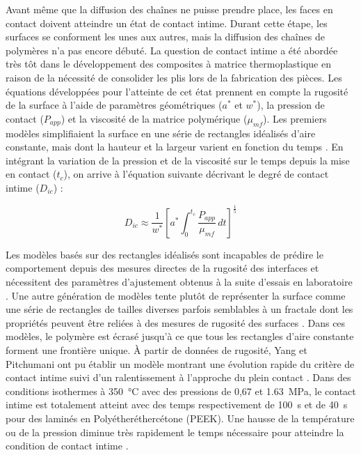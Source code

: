 Avant même que la diffusion des chaînes ne puisse prendre place, les faces en contact doivent atteindre un état de contact intime. 
Durant cette étape, les surfaces se conforment les unes aux autres, mais la diffusion des chaînes de polymères n'a pas encore débuté. 
La question de contact intime a été abordée très tôt dans le développement des composites à matrice thermoplastique en raison de la nécessité de consolider les plis lors de la fabrication des pièces. 
Les équations développées pour l'atteinte de cet état prennent en compte la rugosité de la surface à l'aide de paramètres géométriques ($a^*$ et $w^*$), la pression de contact ($P_{app}$) et la viscosité de la matrice polymérique ($\mu _{mf}$). 
Les premiers modèles simplifiaient la surface en une série de rectangles idéalisés d'aire constante, mais dont la hauteur et la largeur varient en fonction du temps \cite{Lee1987}. 
En intégrant la variation de la pression et de la viscosité sur le temps depuis la mise en contact ($t_c$), on arrive à l'équation suivante décrivant le degré de contact intime ($D_{ic}$) \cite{Mantell1992a} : 

\begin{equation}
D_{ic} \approx \frac{1}{w^*} \left[ a^* \int_{0}^{t_c} \frac{P_{app}}{\mu _{mf}} \, dt \right]^{\frac{1}{5}}
\label{eq:contact_intime}
\end{equation}

Les modèles basés sur des rectangles idéalisés sont incapables de prédire le comportement depuis des mesures directes de la rugosité des interfaces et nécessitent des paramètres d'ajustement obtenus à la suite d'essais en laboratoire \cite{Yang2001}. 
Une autre génération de modèles tente plutôt de représenter la surface comme une série de rectangles de tailles diverses parfois semblables à un fractale dont les propriétés peuvent être reliées à des mesures de rugosité des surfaces \cite{Yang2001,Yang2002}. 
Dans ces modèles, le polymère est écrasé jusqu'à ce que tous les rectangles d'aire constante forment une frontière unique. 
À partir de données de rugosité, Yang et Pitchumani ont pu établir un modèle montrant une évolution rapide du critère de contact intime suivi d'un ralentissement à l'approche du plein contact \cite{Yang2001}. 
Dans des conditions isothermes à \SI[locale=FR]{350}{\celsius} avec des pressions de 0,67 et \SI[locale=FR]{1,63}{\mega\pascal}, le contact intime est totalement atteint avec des temps respectivement de \SI[locale=FR]{100}{\second} et de \SI[locale=FR]{40}{\second} pour des laminés en Polyétheréthercétone (PEEK). 
Une hausse de la température ou de la pression diminue très rapidement le temps nécessaire pour atteindre la condition de contact intime \cite{Yang2002}. 

